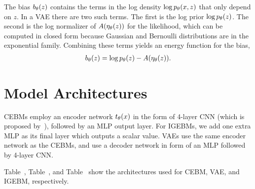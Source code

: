\documentclass[tablecaption=bottom,wcp]{jmlr} %
\begin{document}
The bias $b_\theta(z)$ contains the terms in the log density $\log p_\theta(x,z)$ that only depend on $z$. In a VAE there are two such terms. The first is the log prior $\log p_\theta(z)$. The second is the log normalizer of $A(\eta_\theta(z))$ for the likelihood, which can be computed in closed form because Gaussian and Bernoulli distributions are in the exponential family. Combining these terms yields an energy function for the bias, 
\begin{align}
    \label{eq:vae-bias}
    b_\theta(z) = \log p_\theta(z) - A(\eta_\theta(z)).
\end{align}


\newpage
\section{Model Architectures}
\label{appendix-architectures}
CEBMs employ an encoder network $t_\theta(x)$ in the form of 4-layer CNN (which is proposed by~\citet{nijkamp2019anatomy}), followed by an MLP output layer. For IGEBMs, we add one extra MLP as its final layer which outputs a scalar value. VAEs use the same encoder network as the CEBMs, and use a decoder network in form of an MLP followed by 4-layer CNN. 

Table~, Table~, and Table~ show the architectures used for CEBM, VAE, and IGEBM, respectively.
\end{document}
